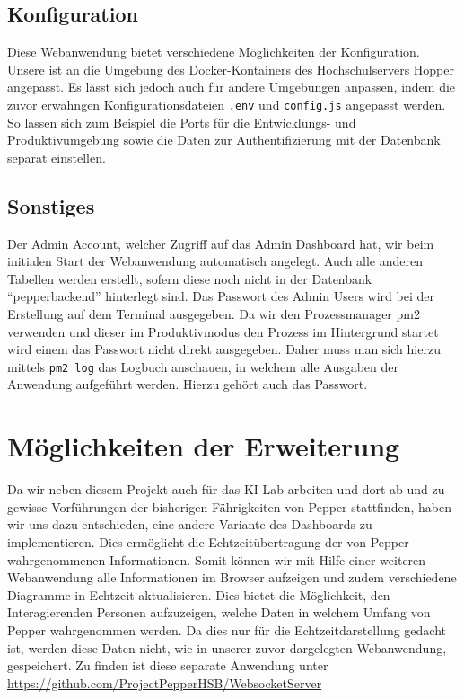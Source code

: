 \subsection*{Konfiguration}
\label{sec:nodechapter-config}
Diese Webanwendung bietet verschiedene Möglichkeiten der Konfiguration. Unsere ist an die Umgebung des Docker-Kontainers
des Hochschulservers Hopper angepasst. Es lässt sich jedoch auch für andere Umgebungen anpassen, indem die zuvor erwähngen
Konfigurationsdateien \verb|.env| und \verb|config.js| angepasst werden. So lassen sich zum Beispiel die Ports
für die Entwicklungs- und Produktivumgebung sowie die Daten zur Authentifizierung mit der Datenbank separat einstellen.


\subsection*{Sonstiges}
\label{sec:nodechapter-install-other}
Der Admin Account, welcher Zugriff auf das Admin Dashboard hat, wir beim initialen Start der Webanwendung automatisch angelegt.
Auch alle anderen Tabellen werden erstellt, sofern diese noch nicht in der Datenbank ``pepperbackend'' hinterlegt sind.
Das Passwort des Admin Users wird bei der Erstellung auf dem Terminal ausgegeben. Da wir den Prozessmanager pm2 verwenden
und dieser im Produktivmodus den Prozess im Hintergrund startet wird einem das Passwort nicht direkt ausgegeben. Daher muss
man sich hierzu mittels \verb|pm2 log| das Logbuch anschauen, in welchem alle Ausgaben der Anwendung aufgeführt werden. Hierzu
gehört auch das Passwort.


\section{Möglichkeiten der Erweiterung}
Da wir neben diesem Projekt auch für das KI Lab arbeiten und dort ab und zu gewisse Vorführungen der bisherigen Fährigkeiten von
Pepper stattfinden, haben wir uns dazu entschieden, eine andere Variante des Dashboards zu implementieren. Dies ermöglicht die
Echtzeitübertragung der von Pepper wahrgenommenen Informationen. Somit können wir mit Hilfe einer weiteren Webanwendung alle Informationen
im Browser aufzeigen und zudem verschiedene Diagramme in Echtzeit aktualisieren. Dies bietet die Möglichkeit, den Interagierenden Personen
aufzuzeigen, welche Daten in welchem Umfang von Pepper wahrgenommen werden. Da dies nur für die Echtzeitdarstellung gedacht ist,
werden diese Daten nicht, wie in unserer zuvor dargelegten Webanwendung, gespeichert. Zu finden ist diese separate Anwendung
unter \href{https://github.com/ProjectPepperHSB/WebsocketServer}{https://github.com/ProjectPepperHSB/WebsocketServer}

